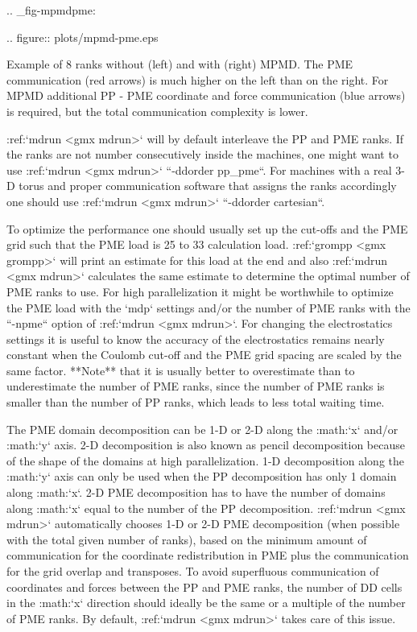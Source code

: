 .. _fig-mpmdpme:

.. figure:: plots/mpmd-pme.eps

   Example of 8 ranks without (left) and with (right) MPMD. The
   PME communication (red arrows) is much higher on the left than on the
   right. For MPMD additional PP - PME coordinate and force
   communication (blue arrows) is required, but the total communication
   complexity is lower.

:ref:`mdrun <gmx mdrun>` will by default interleave the PP and PME ranks.
If the ranks are not number consecutively inside the machines, one might
want to use :ref:`mdrun <gmx mdrun>` ``-ddorder pp_pme``. For machines with a
real 3-D torus and proper communication software that assigns the ranks
accordingly one should use :ref:`mdrun <gmx mdrun>` ``-ddorder cartesian``.

To optimize the performance one should usually set up the cut-offs and
the PME grid such that the PME load is 25 to 33%
calculation load. :ref:`grompp <gmx grompp>` will print an estimate for this
load at the end and also :ref:`mdrun <gmx mdrun>` calculates the same
estimate to determine the optimal number of PME ranks to use. For high
parallelization it might be worthwhile to optimize the PME load with the
`mdp` settings and/or the number of PME ranks with the
``-npme`` option of :ref:`mdrun <gmx mdrun>`. For changing the
electrostatics settings it is useful to know the accuracy of the
electrostatics remains nearly constant when the Coulomb cut-off and the
PME grid spacing are scaled by the same factor. **Note** that it is
usually better to overestimate than to underestimate the number of PME
ranks, since the number of PME ranks is smaller than the number of PP
ranks, which leads to less total waiting time.

The PME domain decomposition can be 1-D or 2-D along the :math:`x`
and/or :math:`y` axis. 2-D decomposition is also known as pencil
decomposition 
because of the
shape of the domains at high parallelization. 1-D decomposition along
the :math:`y` axis can only be used when the PP decomposition has only 1
domain along :math:`x`. 2-D PME decomposition has to have the number of
domains along :math:`x` equal to the number of the PP decomposition.
:ref:`mdrun <gmx mdrun>` automatically chooses 1-D or 2-D PME decomposition
(when possible with the total given number of ranks), based on the
minimum amount of communication for the coordinate redistribution in PME
plus the communication for the grid overlap and transposes. To avoid
superfluous communication of coordinates and forces between the PP and
PME ranks, the number of DD cells in the :math:`x` direction should
ideally be the same or a multiple of the number of PME ranks. By
default, :ref:`mdrun <gmx mdrun>` takes care of this issue.


